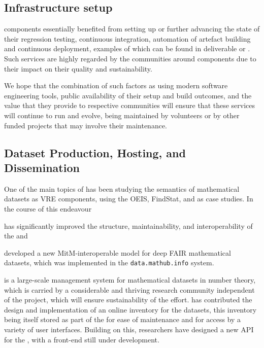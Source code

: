 \documentclass{deliverablereport}
\def\dmh{\texttt{data.mathub.info}\xspace}
\begin{document}
\subsection{Infrastructure setup}

\ODK components essentially benefited from setting up or further
advancing the state of their regression testing, continuous
integration, automation of artefact building and continuous
deployment, examples of which can be found in deliverable
 or
.
Such services are highly regarded by the communities around
\ODK components due to their impact on their quality and
sustainability.

We hope that the combination of such factors as using modern
software engineering tools, public availability of their
setup and build outcomes, and the value that they provide to
respective communities will ensure that these services will
continue to run and evolve, being maintained by volunteers
or by other funded projects that may involve their maintenance.

\subsection{Dataset Production, Hosting, and Dissemination}

One of the main topics of  has been studying the semantics of mathematical
datasets as VRE components, using the OEIS, FindStat, and \LMFDB as case studies. In the
course of this endeavour \pn
\begin{compactenum}
\item has significantly improved the structure, maintainability, and interoperability of
  the \LMFDB and
\item developed a new MitM-interoperable model for deep FAIR mathematical datasets, which
  was implemented in the \dmh system.
\end{compactenum}
\LMFDB is a large-scale management system for mathematical datasets in number theory, which
is carried by a considerable and thriving research community independent of the \pn
project, which will ensure sustainability of the effort.
\pn has contributed the design and implementation of an online inventory for the \LMFDB datasets,
this inventory being itself stored as part of the \LMFDB for ease of maintenance and for access by a variety of user interfaces.
Building on this, \ODK researchers have designed a new API for the \LMFDB, with a \Sage front-end still under development.
\end{document}

